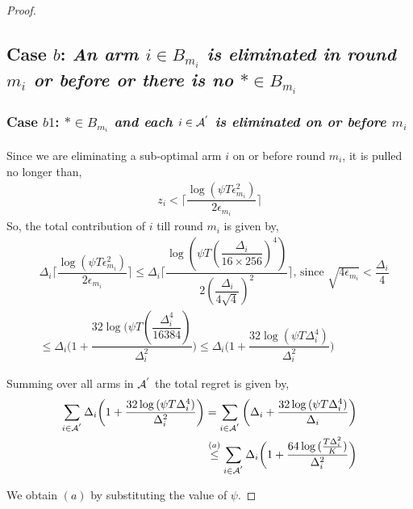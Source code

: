 \begin{proof}
\subsection*{Case $b$: \textit{An arm ${i}\in B_{m_i}$ is eliminated in round $m_{i}$ or before or there is no $*\in B_{m_i}$}}

\subsubsection*{Case $b1$: \textit{${*}\in B_{m_{i}}$ and each ${i}\in \mathcal{A}^{'}$ is  eliminated on or before $m_{i}$ } }

	\paragraph*{} Since we are eliminating a sub-optimal arm ${i}$ on or before round $m_{i}$, it is pulled no longer than, 
 \begin{align*}
 z_{i} < \bigg\lceil\dfrac{\log{(\psi T\epsilon_{m_{i}}^{2})}}{2\epsilon_{m_{i}}}\bigg\rceil
 \end{align*}
So, the total contribution of ${i}$  till round $m_{i}$ is given by, 
\begin{align*}
&\Delta_{i}\bigg\lceil\dfrac{\log{(\psi T\epsilon_{m_{i}}^{2})}}{2\epsilon_{m_{i}}}\bigg\rceil
\leq\Delta_{i}\bigg\lceil\dfrac{\log{(\psi T(\dfrac{\Delta_{i}}{16 \times 256})^{4})}}{2(\dfrac{\Delta_{i}}{4\sqrt{4}})^{2}}\bigg\rceil \text{, since } \sqrt{4\epsilon_{m_{i}}} < \dfrac{\Delta_{i}}{4}\\
&\leq\Delta_{i}\bigg(1+\dfrac{32\log{(\psi T(\dfrac{\Delta_{i}^{4}}{16384})}}{\Delta_{i}^{2}}\bigg)
\leq \Delta_{i}\bigg(1+\dfrac{32\log{(\psi T\Delta_{i}^{4})}}{\Delta_{i}^{2}}\bigg) 
\end{align*} 

Summing over all arms in $\mathcal{A}^{'}$ the total regret is given by, 
\begin{align*}
\sum_{i\in \mathcal{A}^{'}}\Delta_{i}\bigg(1+\dfrac{32\log{(\psi T\Delta_{i}^{4}})}{\Delta_{i}^{2}}\bigg) = \sum_{i\in \mathcal{A}^{'}}\bigg(\Delta_{i} +\dfrac{32\log{(\psi T\Delta_{i}^{4}})}{\Delta_{i}}\bigg) \\
\overset{(a)}{\leq} \sum_{i\in \mathcal{A}^{'}} \Delta_{i}\bigg(1+\dfrac{64\log{( \frac{T\Delta_{i}^{2}}{K})}}{\Delta_{i}^{2}}\bigg)
\end{align*}

We obtain $(a)$ by substituting the value of $\psi$. 


\end{proof}
